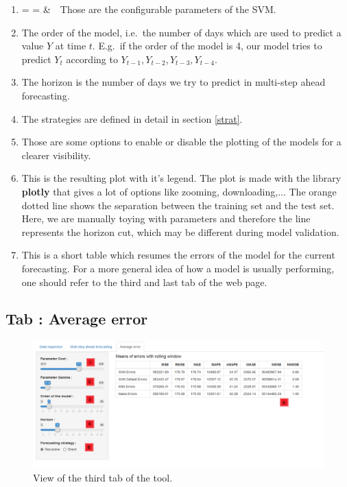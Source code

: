 \documentclass[11pt,a4paper,oneside]{book}
\makeatletter
\newcommand{\inlineitem}[1][]{%
\ifnum\enit@type=\tw@
    {\descriptionlabel{#1}}
  \hspace{\labelsep}
\else
  \ifnum\enit@type=\z@
       \refstepcounter{\@listctr}\fi
    \&\ \@itemlabel\ 
\fi}
\makeatother
\begin{document}
\begin{enumerate}
\item\inlineitem Those are the configurable parameters of the SVM.
\item The order of the model, i.e.\ the number of days which are used to predict a value $Y$ at time $t$. E.g.\, if the order of the model is 4, our model tries to predict $Y_t$ according to  $Y_{t-1}, Y_{t-2}, Y_{t-3}, Y_{t-4}$.
\item The horizon is the number of days we try to predict in multi-step ahead forecasting.
\item The strategies are defined in detail in section \ref{strat}.
\item Those are some options to enable or disable the plotting of the models for a clearer visibility.
\item This is the resulting plot with it's legend. The plot is made with the library \textbf{plotly} that gives a lot of options like zooming, downloading,... The orange dotted line shows the separation between the training set and the test set. Here, we are manually toying with parameters and therefore the line represents the horizon cut, which may be different during model validation.
\item This is a short table which resumes the errors of the model for the current forecasting. For a more general idea of how a model is usually performing, one should refer to the third and last tab of the web page. 
\end{enumerate}



\subsection{Tab : Average error}

\begin{figure}[!h]
  \centering
    \includegraphics[scale=0.44]{img/tab3.png}
  \caption{View of the third tab of the tool.}
  \label{fig:tool3}
\end{figure}
\end{document}
